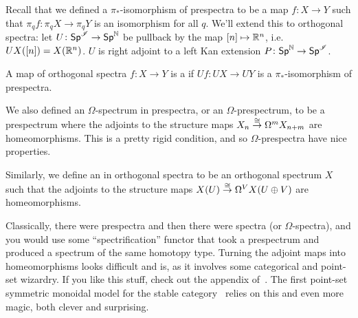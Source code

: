 Recall that we defined a $\pi_*$-isomorphism of prespectra to be a map $f\colon X\to Y$ such that $\pi_qf\colon
\pi_q X\to\pi_q Y$ is an isomorphism for all $q$. We'll extend this to orthogonal spectra: let
$U\colon\mathsf{Sp}^\mathscr I\to\mathsf{Sp}^\mathbb N$ be pullback by the map $[n]\mapsto\R^n$, i.e.\ $UX([n]) = X(\mathbb R^n)$. $U$ is right
adjoint to a left Kan extension $P\colon\mathsf{Sp}^\mathbb N\to\mathsf{Sp}^\mathscr I$.
\begin{defn}
A map of orthogonal spectra $f\colon X\to Y$ is a  if $Uf\colon UX\to UY$ is a
$\pi_*$-isomorphism of prespectra.
\end{defn}
We also defined an $\Omega$-spectrum in prespectra, or an $\Omega$-prespectrum, to be a prespectrum where the
adjoints to the structure maps $X_n\stackrel\cong\to\Omega^mX_{n+m}$ are homeomorphisms. This is a pretty rigid condition,
and so $\Omega$-prespectra have nice properties.
\begin{defn}
Similarly, we define an  in orthogonal spectra to be an orthogonal spectrum $X$ such that
the adjoints to the structure maps $X(U)\stackrel\cong\to\Omega^V X(U\oplus V)$ are homeomorphisms.
\end{defn}
Classically, there were prespectra and then there were spectra (or $\Omega$-spectra), and you would use some
``spectrification'' functor that took a prespectrum and produced a spectrum of the same homotopy type. Turning the
adjoint maps into homeomorphisms looks difficult and is, as it involves some categorical and point-set wizardry. If
you like this stuff, check out the appendix of~\cite{LMS}. The first point-set symmetric monoidal model for the
stable category~\cite{EKMM} relies on this and even more magic, both clever and surprising.

